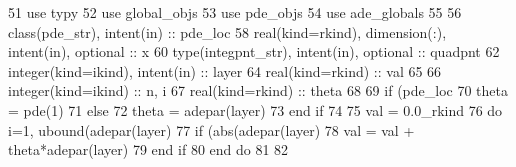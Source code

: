 \begin{DoxyCode}
51       \textcolor{keywordtype}{use }typy
52       \textcolor{keywordtype}{use }global_objs
53       \textcolor{keywordtype}{use }pde_objs
54       \textcolor{keywordtype}{use }ade_globals
55       
56       \textcolor{keywordtype}{class}(pde_str), \textcolor{keywordtype}{intent(in)} :: pde\_loc
58       \textcolor{keywordtype}{real(kind=rkind)}, \textcolor{keywordtype}{dimension(:)}, \textcolor{keywordtype}{intent(in)}, \textcolor{keywordtype}{optional}    :: x
60       \textcolor{keywordtype}{type}(integpnt_str), \textcolor{keywordtype}{intent(in)}, \textcolor{keywordtype}{optional} :: quadpnt
62       \textcolor{keywordtype}{integer(kind=ikind)}, \textcolor{keywordtype}{intent(in)} :: layer
64       \textcolor{keywordtype}{real(kind=rkind)}                :: val 
65       
66       \textcolor{keywordtype}{integer(kind=ikind)} :: n, i
67       \textcolor{keywordtype}{real(kind=rkind)} :: theta
68       
69       \textcolor{keywordflow}{if} (pde\_loc%
70         theta = pde(1)%
71       \textcolor{keywordflow}{else}
72         theta = adepar(layer)%
73 \textcolor{keywordflow}{      end if}
74       
75        val = 0.0\_rkind
76        \textcolor{keywordflow}{do} i=1, ubound(adepar(layer)%
77         \textcolor{keywordflow}{if} (abs(adepar(layer)%
78           val =  val + theta*adepar(layer)%
79 \textcolor{keywordflow}{        end if}
80 \textcolor{keywordflow}{      end do}
81       
82       
\end{DoxyCode}
